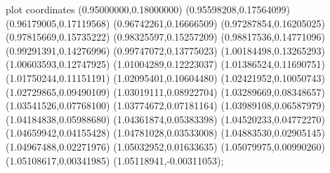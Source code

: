  plot coordinates {(0.95000000,0.18000000) (0.95598208,0.17564099) (0.96179005,0.17119568) (0.96742261,0.16666509) (0.97287854,0.16205025) (0.97815669,0.15735222) (0.98325597,0.15257209) (0.98817536,0.14771096) (0.99291391,0.14276996) (0.99747072,0.13775023) (1.00184498,0.13265293) (1.00603593,0.12747925) (1.01004289,0.12223037) (1.01386524,0.11690751) (1.01750244,0.11151191) (1.02095401,0.10604480) (1.02421952,0.10050743) (1.02729865,0.09490109) (1.03019111,0.08922704) (1.03289669,0.08348657) (1.03541526,0.07768100) (1.03774672,0.07181164) (1.03989108,0.06587979) (1.04184838,0.05988680) (1.04361874,0.05383398) (1.04520233,0.04772270) (1.04659942,0.04155428) (1.04781028,0.03533008) (1.04883530,0.02905145) (1.04967488,0.02271976) (1.05032952,0.01633635) (1.05079975,0.00990260) (1.05108617,0.00341985) (1.05118941,-0.00311053)};
